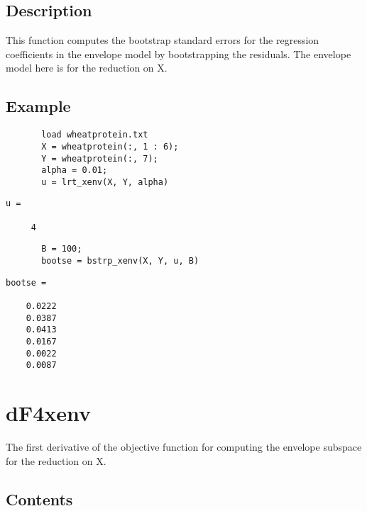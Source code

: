 \documentclass[a4paper,11pt,openany]{memoir}
\begin{document}
\subsection*{Description}

\begin{par}
This function computes the bootstrap standard errors for the regression coefficients in the envelope model by bootstrapping the residuals. The envelope model here is for the reduction on X.
\end{par} \vspace{1em}


\subsection*{Example}


\begin{verbatim}       load wheatprotein.txt
       X = wheatprotein(:, 1 : 6);
       Y = wheatprotein(:, 7);
       alpha = 0.01;
       u = lrt_xenv(X, Y, alpha)\end{verbatim}
        \color{lightgray}\ttfamily \begin{verbatim}
u =

     4
\end{verbatim} \rmfamily
\color{black}    
     \begin{verbatim}
       B = 100;
       bootse = bstrp_xenv(X, Y, u, B)\end{verbatim}
    
        \color{lightgray}\ttfamily \begin{verbatim}
bootse =

    0.0222
    0.0387
    0.0413
    0.0167
    0.0022
    0.0087

\end{verbatim} \rmfamily
\color{black}    
\newpage
    
\rmfamily
\color{black}\section{dF4xenv}

\begin{par}
The first derivative of the objective function for computing the envelope subspace for the reduction on X.
\end{par} \vspace{1em}

\subsection*{Contents}
\end{document}
